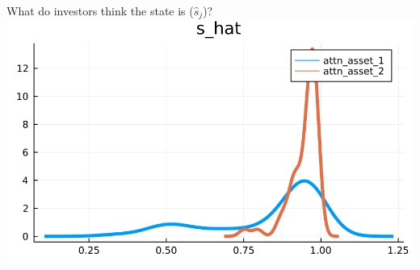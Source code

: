 \documentclass[
  ignorenonframetext,
]{beamer}
\begin{document}
\begin{frame}{What do investors think the state is (\(\hat s_j\))?}
\includegraphics[width=0.4\paperheight]{complexity_files/figure-beamer/unnamed-chunk-17-4}
\end{frame}
\end{document}

